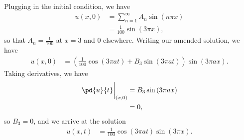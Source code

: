 \documentclass[10pt]{mypackage}
\begin{document}
\begin{solution}[12.4, Problem 6]
  Plugging in the initial condition, we have
  \begin{align*}
    u\left( x,0 \right) &= \sum_{n=1}^{\infty} A_n\sin\left( n\pi x \right)\\
                        &= \frac{1}{100}\sin\left( 3\pi x \right),
  \end{align*}
  so that $A_n = \frac{1}{100}$ at $x = 3$ and $0$ elsewhere. Writing our amended solution, we have
  \begin{align*}
    u\left( x,0 \right) &= \left( \frac{1}{100}\cos\left( 3\pi a t \right) + B_{3}\sin\left( 3\pi a t \right) \right)\sin\left( 3\pi a x \right).
  \end{align*}
  Taking derivatives, we have
  \begin{align*}
    \pd{u}{t}\biggr\vert_{(x,0)} &= B_3\sin\left( 3\pi a x \right)\\
                                 &= 0,
  \end{align*}
  so $B_3 = 0$, and we arrive at the solution
  \begin{align*}
    u\left( x,t \right) &= \frac{1}{100}\cos\left( 3\pi a t \right)\sin\left( 3\pi x \right).
  \end{align*}
\end{solution}
\end{document}
